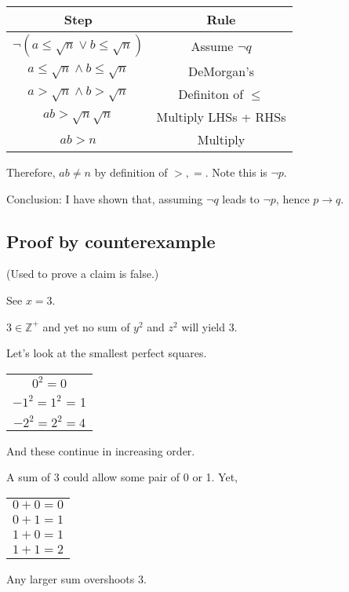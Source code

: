 \documentclass[english,openany]{book}
\begin{document}
	\begin{tabular}{c|c}
		Step&Rule\\
		\hline
		$\neg(a \leq \sqrt{n} \lor b \leq \sqrt{n})$ & Assume $\neg q$\\

		$a \leq \sqrt{n} \wedge b \leq \sqrt{n}$ & DeMorgan's\\

		$a > \sqrt{n} \wedge b > \sqrt{n}$ & Definiton of $\leq$\\

		$ab > \sqrt{n}\sqrt{n}$ & Multiply LHSs + RHSs\\

		$ab > n$ & Multiply\\
	\end{tabular}

	Therefore, $ab \neq n$ by definition of $>, =$. Note this is $\neg p$.

	Conclusion: I have shown that, assuming $\neg q$ leads to $\neg p$, hence $p \rightarrow q$. \newline

	\subsection{Proof by counterexample}

   (Used to prove a claim is false.)

	See $x=3$.

	$3 \in \mathbb Z^+$ and yet no sum of $y^2$ and $z^2$ will yield $3$.

	Let's look at the smallest perfect squares.

	\begin{tabular}{c}
		$0^2 = 0$\\
		$-1^2 = 1^2$ = 1\\
		$-2^2 = 2^2 = 4$\\
	\end{tabular}

	And these continue in increasing order.

	A sum of 3 could allow some pair of 0 or 1. Yet,

	\begin{tabular}{c}
		$0+0=0$\\
		$0+1=1$\\
		$1+0=1$\\
		$1+1=2$\\
	\end{tabular}

	Any larger sum overshoots 3.
\end{document}
